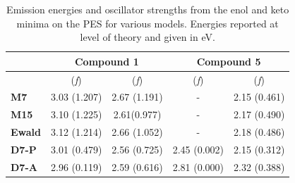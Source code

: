 \begin{table}[t]
\centering
  \caption[Emission energies in the solid state]{Emission energies and oscillator strengths from the enol and keto minima on the \sone{} PES for various models. Energies reported at \highlevel level of theory and given in eV.}
\label{table: Inter_emis}
  \begin{tabular}{lcccc}
    \hline
    &
    \multicolumn{2}{c}{Compound \textbf{1}} 
    &
    \multicolumn{2}{c}{Compound \textbf{5}}\\
    \hline
     & \Estar{} (\textit{f}) & \Kstar{} (\textit{f}) &
    \Estar{} (\textit{f}) & \Kstar{} (\textit{f})\\
    \hline
    
    {\textbf{M7}} & 
	3.03 (1.207) & 2.67 (1.191) & -  & 2.15 (0.461) \\

    {\textbf{M15}} & 
	3.10 (1.225) & 2.61(0.977) & - & 2.17 (0.490)\\
    
    {\textbf{Ewald}} & 
	3.12 (1.214) & 2.66 (1.052) & -  & 2.18 (0.486)\\

    {\textbf{D7-P}} & 
	3.01 (0.479) & 2.56 (0.725) & 2.45 (0.002) & 2.15 (0.312) \\
    
    {\textbf{D7-A}} & 
	2.96 (0.119) & 2.59 (0.616) & 2.81 (0.000)  & 2.32 (0.388) \\
	\hline
  \end{tabular}
\end{table}


